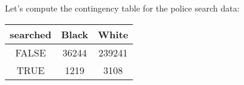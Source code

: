 \documentclass[]{book}
\newenvironment{Shaded}{\begin{snugshade}}{\end{snugshade}}
\newcommand{\KeywordTok}[1]{\textcolor[rgb]{0.13,0.29,0.53}{\textbf{#1}}}
\newcommand{\DataTypeTok}[1]{\textcolor[rgb]{0.13,0.29,0.53}{#1}}
\newcommand{\StringTok}[1]{\textcolor[rgb]{0.31,0.60,0.02}{#1}}
\newcommand{\CommentTok}[1]{\textcolor[rgb]{0.56,0.35,0.01}{\textit{#1}}}
\newcommand{\OperatorTok}[1]{\textcolor[rgb]{0.81,0.36,0.00}{\textbf{#1}}}
\newcommand{\NormalTok}[1]{#1}
\theoremstyle{definition}
\theoremstyle{definition}
\theoremstyle{definition}
\theoremstyle{remark}
\begin{document}
Let's compute the contingency table for the police search data:

\begin{Shaded}
\end{Shaded}

\begin{longtable}[]{@{}ccc@{}}
\toprule
\begin{minipage}[b]{0.14\columnwidth}\centering\strut
searched\strut
\end{minipage} & \begin{minipage}[b]{0.10\columnwidth}\centering\strut
Black\strut
\end{minipage} & \begin{minipage}[b]{0.10\columnwidth}\centering\strut
White\strut
\end{minipage}\tabularnewline
\midrule
\endhead
\begin{minipage}[t]{0.14\columnwidth}\centering\strut
FALSE\strut
\end{minipage} & \begin{minipage}[t]{0.10\columnwidth}\centering\strut
36244\strut
\end{minipage} & \begin{minipage}[t]{0.10\columnwidth}\centering\strut
239241\strut
\end{minipage}\tabularnewline
\begin{minipage}[t]{0.14\columnwidth}\centering\strut
TRUE\strut
\end{minipage} & \begin{minipage}[t]{0.10\columnwidth}\centering\strut
1219\strut
\end{minipage} & \begin{minipage}[t]{0.10\columnwidth}\centering\strut
3108\strut
\end{minipage}\tabularnewline
\bottomrule
\end{longtable}
\end{document}
